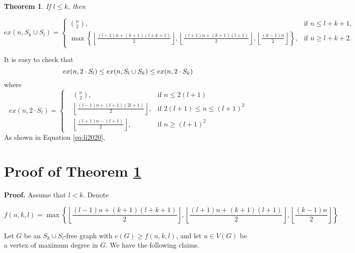 \documentclass[12pt]{elsarticle}
\newtheorem{theorem}{Theorem}
\begin{document}
\begin{theorem}\label{thm1}
    If $l \le k$, then
    \begin{footnotesize}
    \[
    ex(n, S_{k} \cup S_{l}) = 
    \begin{cases} 
    \binom{n}{2}, & \text{if } n \le l + k + 1, \\
    \max\left\{\left\lfloor \frac{(l-1)n+(k+1)(l+k+1)}{2} \right\rfloor, \left\lfloor \frac{(l+1)n+(k+1)(l+1)}{2} \right\rfloor, \left\lfloor \frac{(k-1)n}{2} \right\rfloor\right\}, & \text{if } n \ge l + k + 2.
    \end{cases}
    \]
\end{footnotesize}
    \end{theorem}



It is easy to check that 
\begin{equation}
ex(n, 2 \cdot S_{l}) \leq ex(n, S_{l}\cup S_{k}) \leq ex(n, 2 \cdot S_{k}) \notag
\end{equation}
where
\begin{equation}
ex(n, 2 \cdot S_{l}) = \left\{
\begin{aligned}
    &\binom{n}{2}, & \text{if } n \le 2(l+1) \\ 
    &\left\lfloor \frac{(l-1)n+(l+1)(2l+1)}{2} \right\rfloor, & \text{if }  2(l+1) \le n \le (l+1)^2 \\
    &\left\lfloor \frac{(l+1)n-(l+1)}{2} \right\rfloor, & \text{if } n \ge (l+1)^2 
\end{aligned}
\right.
\label{eq:li2020}
\end{equation}
As shown in Equation \ref{eq:li2020}, \cite{li2020}







\section{Proof of Theorem \ref{thm1}}
\textbf{Proof.}
Assume that \( l < k \).
Denote 
\begin{footnotesize}
$$f(n,k,l)=\max\left\{\left\lfloor \frac{(l-1)n+(k+1)(l+k+1)}{2} \right\rfloor, \left\lfloor \frac{(l+1)n+(k+1)(l+1)}{2} \right\rfloor, \left\lfloor \frac{(k-1)n}{2} \right\rfloor\right\}
$$
\end{footnotesize}
Let $G$ be an $S_k \cup S_l$-free graph with $e(G)\ge f(n,k,l)$, and let $u \in V(G)$ be a vertex of maximum degree in $G$. We have the following claims. \\
\end{document}
